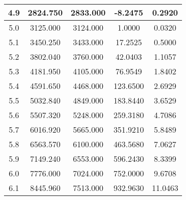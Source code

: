 \begin{table}[h!]
\begin{tabular}{|c|c|c|c|c|}
        4.9        & 2824.750       & 2833.000                          & -8.2475       & 0.2920                \\ \hline
        5.0        & 3125.000       & 3124.000                          & 1.0000        & 0.0320                \\ \hline
        5.1        & 3450.250       & 3433.000                          & 17.2525       & 0.5000                \\ \hline
        5.2        & 3802.040       & 3760.000                          & 42.0403       & 1.1057                \\ \hline
        5.3        & 4181.950       & 4105.000                          & 76.9549       & 1.8402                \\ \hline
        5.4        & 4591.650       & 4468.000                          & 123.6500      & 2.6929                \\ \hline
        5.5        & 5032.840       & 4849.000                          & 183.8440      & 3.6529                \\ \hline
        5.6        & 5507.320       & 5248.000                          & 259.3180      & 4.7086                \\ \hline
        5.7        & 6016.920       & 5665.000                          & 351.9210      & 5.8489                \\ \hline
        5.8        & 6563.570       & 6100.000                          & 463.5680      & 7.0627                \\ \hline
        5.9        & 7149.240       & 6553.000                          & 596.2430      & 8.3399                \\ \hline
        6.0        & 7776.000       & 7024.000                          & 752.0000      & 9.6708                \\ \hline
        6.1        & 8445.960       & 7513.000                          & 932.9630      & 11.0463               \\ \hline
    \end{tabular}\label{tab:table2}
\end{table}
